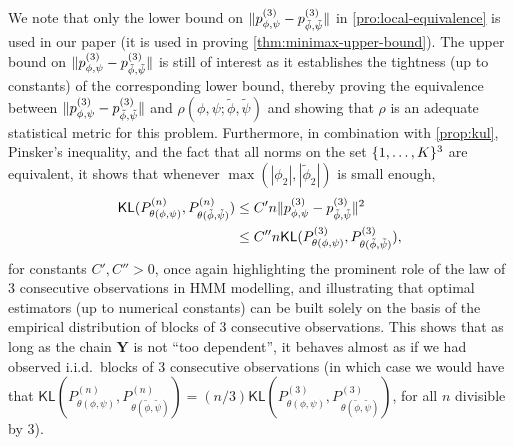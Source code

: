 \documentclass[journal]{IEEEtran}
\newcommand{\1}{\boldsymbol{1}}
\newcommand{\KL}{\mathsf{KL}}
\DeclarePairedDelimiter{\braces}{\{}{\}}
\DeclarePairedDelimiter{\norm}{\lVert}{\rVert}
\begin{document}
    We note that only the lower bound on $\norm{p_{\phi,\psi}^{(3)} - p_{\tilde{\phi},\tilde{\psi}}^{(3)}}$ in \cref{pro:local-equivalence} is used in our paper (it is used in proving \cref{thm:minimax-upper-bound}). The upper bound on $\norm{p_{\phi,\psi}^{(3)} - p_{\tilde{\phi},\tilde{\psi}}^{(3)}}$ is still of interest as it establishes the tightness (up to constants) of the corresponding lower bound, thereby proving the equivalence between $\norm{p_{\phi,\psi}^{(3)} - p_{\tilde{\phi},\tilde{\psi}}^{(3)}}$ and $\rho(\phi,\psi;\tilde{\phi},\tilde{\psi})$ and showing that $\rho$ is %
    an   adequate statistical metric for this problem. Furthermore, in combination with \cref{prop:kul}, Pinsker's inequality, and the fact that all norms on the set $\braces{1,\dots,K}^3$ are equivalent, it shows that whenever $\max(|\phi_2|,|\tilde{\phi}_2|)$ is small enough,
    \begin{align*}
      \KL(P_{\theta(\phi,\psi)}^{(n)},P_{\theta(\tilde{\phi},\tilde{\psi})}^{(n)})%
      &\leq C' n \norm{p_{\phi,\psi}^{(3)} - p_{\tilde{\phi},\tilde{\psi}}^{(3)}}^2\\
      &\leq C'' n \KL(P_{\theta(\phi,\psi)}^{(3)},P_{\theta(\tilde{\phi},\tilde{\psi})}^{(3)}),
    \end{align*}
    for constants $C',C'' > 0$, once again highlighting the prominent role of the law of 3 consecutive observations in HMM modelling, and illustrating that optimal estimators (up to numerical constants) can be built solely on the basis of the empirical distribution of blocks of 3 consecutive observations. %
 This shows that as long as the chain $\bm{Y}$ is not ``too dependent'', it behaves almost as if we had observed i.i.d.\ blocks of 3 consecutive observations (in which case we would have that $\KL(P_{\theta(\phi,\psi)}^{(n)},P_{\theta(\tilde{\phi},\tilde{\psi})}^{(n)}) =  (n/3)\KL(P_{\theta(\phi,\psi)}^{(3)},P_{\theta(\tilde{\phi},\tilde{\psi})}^{(3)})$, for all $n$ divisible by $3$). %
\end{document}
